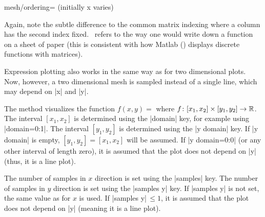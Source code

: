 {\begin{pgfplotskey}{mesh/ordering= (initially x varies)}
\begin{codeexample}[]
\end{codeexample}
	Again, note the subtle difference to the common matrix indexing where a column has the second index fixed. \PGFPlots\ refers to the way one would write down a function on a sheet of paper (this is consistent with how Matlab (\textregistered) displays discrete functions with matrices).

\end{pgfplotskey}

\begin{addplot3operation}[]{}{}
\label{cmd:addplot3:expr}
	Expression plotting also works in the same way as for two dimensional plots. Now, however, a two dimensional mesh is sampled instead of a single line, which may depend on |x| and |y|.

	The method   visualizes the function $f(x,y) = $ where $ f \colon [x_1,x_2] \times [y_1,y_2] \to \mathbb{R}$. The interval $[x_1,x_2]$ is determined using the |domain| key, for example using |domain=0:1|. The interval $[y_1,y_2]$ is determined using the |y domain| key. If |y domain| is empty, $[y_1,y_2] = [x_1,x_2]$ will be assumed. If |y domain=0:0| (or any other interval of length zero), it is assumed that the plot does not depend on |y| (thus, it is a line plot).

	The number of samples in $x$ direction is set using the |samples| key. The number of samples in $y$ direction is set using the |samples y| key. If |samples y| is not set, the same value as for $x$ is used. If |samples y|$\,\le 1$, it is assumed that the plot does not depend on |y| (meaning it is a line plot).

\pgfplotsexpensiveexample
\begin{codeexample}[]
\end{codeexample}

\pgfplotsexpensiveexample
\begin{codeexample}[]
\end{codeexample}


\end{addplot3operation}}
